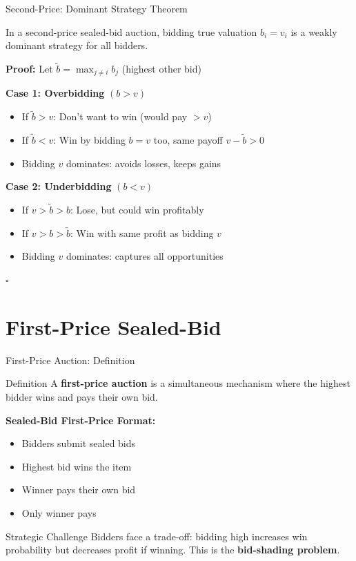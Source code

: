 \documentclass[xcolor={x11names}, aspectratio=169 ]{beamer}
\begin{document}
\begin{frame}{Second-Price: Dominant Strategy Theorem}
\begin{theorem}
In a second-price sealed-bid auction, bidding true valuation $b_i = v_i$ is a weakly dominant strategy for all bidders.
\end{theorem}

\textbf{Proof:} Let $\tilde{b} = \max_{j \neq i} b_j$ (highest other bid)

\textbf{Case 1: Overbidding} $(b > v)$
\begin{itemize}
    \item If $\tilde{b}> v$: Don't want to win (would pay $> v$)
    \item If $\tilde{b}< v$: Win by bidding $b=v$ too, same payoff $v-\tilde{b}>0$
    \item Bidding $v$ dominates: avoids losses, keeps gains
\end{itemize}

\textbf{Case 2: Underbidding} $(b < v)$
\begin{itemize}
  \item If $v > \tilde{b} > b$: Lose, but could win profitably
  \item If $v > b > \tilde{b}$: Win with same profit as bidding $v$ 
  \item Bidding $v$ dominates: captures all opportunities
\end{itemize}

$\square$
\end{frame}

\section{First-Price Sealed-Bid}

\begin{frame}{First-Price Auction: Definition}
\begin{block}{Definition}
A \textbf{first-price auction} is a simultaneous mechanism where the highest bidder wins and pays their own bid.
\end{block}

\textbf{Sealed-Bid First-Price Format:}
\begin{itemize}
\item Bidders submit sealed bids
\item Highest bid wins the item
\item Winner pays their own bid
\item Only winner pays
\end{itemize}

\begin{alertblock}{Strategic Challenge}
Bidders face a trade-off: bidding high increases win probability but decreases profit if winning. This is the \textbf{bid-shading problem}.
\end{alertblock}
\end{frame}
\end{document}
